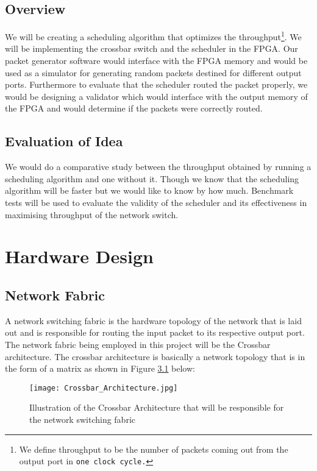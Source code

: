 \documentclass[twoside,12pt,fleqn]{book} %
\begin{document}
\section{Overview}
We will be creating a scheduling algorithm that optimizes the throughput\footnote{We define throughput to be the number of packets coming out from the output port in \texttt{one clock cycle.}}. We will be implementing the crossbar switch and the scheduler in the FPGA. Our packet generator software would interface with the FPGA memory and would be used as a simulator for generating random packets destined for different output ports. Furthermore to evaluate that the scheduler routed the packet properly, we would be designing a validator which would interface with the output memory of the FPGA and would determine if the packets were correctly routed.

\section{Evaluation of Idea}
We would do a comparative study between the throughput obtained by running a scheduling algorithm and one without it. Though we know that the scheduling algorithm will be faster but we would like to know by how much. Benchmark tests will be used to evaluate the validity of the scheduler and its effectiveness in maximising throughput of the network switch.

\let\cleardoublepage\clearpage
{}

\chapter{Hardware Design}

\section{Network Fabric}
A network switching fabric is the hardware topology of the network that is laid out and is responsible for routing the input packet to its respective output port. The network fabric being employed in this project will be the Crossbar architecture. The crossbar architecture is basically a network topology that is in the form of a matrix as shown in Figure \ref{fig:crossbar_illustration} below: 
    \begin{figure}[ht]
        \centering
        \texttt{[image: Crossbar\_Architecture.jpg]}
        \caption{Illustration of the Crossbar Architecture that will be responsible for the network switching fabric}
        \label{fig:crossbar_illustration}
    \end{figure}
\end{document}
